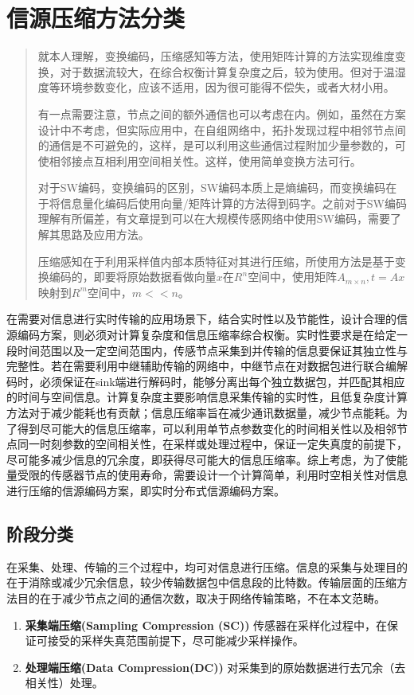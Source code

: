 \section{信源压缩方法分类}

\begin{quote}
    就本人理解，变换编码，压缩感知等方法，使用矩阵计算的方法实现维度变换，对于数据流较大，在综合权衡计算复杂度之后，较为使用。但对于温湿度等环境参数变化，应该不适用，因为很可能得不偿失，或者大材小用。

    有一点需要注意，节点之间的额外通信也可以考虑在内。例如，虽然在方案设计中不考虑，但实际应用中，在自组网络中，拓扑发现过程中相邻节点间的通信是不可避免的，这样，是可以利用这些通信过程附加少量参数的，可使相邻接点互相利用空间相关性。这样，使用简单变换方法可行。

    对于SW编码，变换编码的区别，SW编码本质上是熵编码，而变换编码在于将信息量化编码后使用向量/矩阵计算的方法得到码字。\textcolor[rgb]{1,0,0}{之前对于SW编码理解有所偏差，有文章提到可以在大规模传感网络中使用SW编码，需要了解其思路及应用方法}。

    压缩感知在于利用采样值内部本质特征对其进行压缩，所使用方法是基于变换编码的，即要将原始数据看做向量$x$在$R^n$空间中，使用矩阵$A_{m\times n}, t=Ax$映射到$R^m$空间中，$m<<n$。
\end{quote}

在需要对信息进行实时传输的应用场景下，结合实时性以及节能性，设计合理的信源编码方案，则必须对计算复杂度和信息压缩率综合权衡。实时性要求是在给定一段时间范围以及一定空间范围内，传感节点采集到并传输的信息要保证其独立性与完整性。若在需要利用中继辅助传输的网络中，中继节点在对数据包进行联合编解码时，必须保证在sink端进行解码时，能够分离出每个独立数据包，并匹配其相应的时间与空间信息。计算复杂度主要影响信息采集传输的实时性，且低复杂度计算方法对于减少能耗也有贡献；信息压缩率旨在减少通讯数据量，减少节点能耗。为了得到尽可能大的信息压缩率，可以利用单节点参数变化的时间相关性以及相邻节点同一时刻参数的空间相关性，在采样或处理过程中，保证一定失真度的前提下，尽可能多减少信息的冗余度，即获得尽可能大的信息压缩率。综上考虑，为了使能量受限的传感器节点的使用寿命，需要设计一个计算简单，利用时空相关性对信息进行压缩的信源编码方案，即实时分布式信源编码方案。

\subsection{阶段分类}
在采集、处理、传输的三个过程中，均可对信息进行压缩。信息的采集与处理目的在于消除或减少冗余信息，较少传输数据包中信息段的比特数。传输层面的压缩方法目的在于减少节点之间的通信次数，取决于网络传输策略，不在本文范畴。
\begin{enumerate}
	\item \textbf{采集端压缩(Sampling Compression (SC))} 传感器在采样化过程中，在保证可接受的采样失真范围前提下，尽可能减少采样操作。
        \item \textbf{处理端压缩(Data Compression(DC))} 对采集到的原始数据进行去冗余（去相关性）处理。
\end{enumerate}


